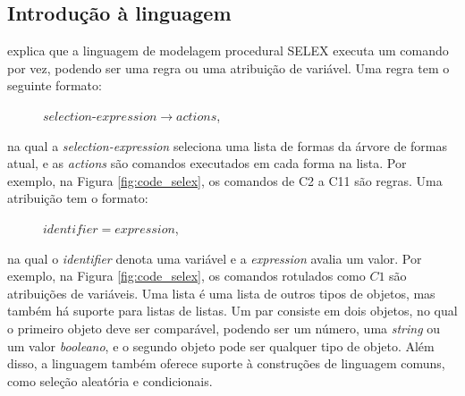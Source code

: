 \newpage

\subsection{Introdução à linguagem}
\label{sec:introducao_selex}

 explica que a linguagem de modelagem procedural \gls{SELEX} executa um comando por vez, podendo ser uma regra ou uma atribuição de variável. Uma regra tem o seguinte formato:

\vspace{0.5cm}

\begin{description}
    \item[] \qquad \qquad $selection\mbox{-}expression \rightarrow actions$,
\end{description}

\vspace{0.5cm}

\noindent na qual a \textit{selection-expression} seleciona uma lista de formas da árvore de formas atual, e as \textit{actions} são comandos executados em cada forma na lista. Por exemplo, na Figura \ref{fig:code_selex}, os comandos de C2 a C11 são regras. Uma atribuição tem o formato:

\vspace{0.5cm}

\begin{description}
    \item[] \qquad \qquad $identifier = expression$,
\end{description}

\vspace{0.5cm}

\noindent na qual o \textit{identifier} denota uma variável e a \textit{expression} avalia um valor. Por exemplo, na Figura \ref{fig:code_selex}, os comandos rotulados como $C1$ são atribuições de variáveis. Uma lista é uma lista de outros tipos de objetos, mas também há suporte para listas de listas. Um par consiste em dois objetos, no qual o primeiro objeto deve ser comparável, podendo ser um número, uma \textit{string} ou um valor \textit{booleano}, e o segundo objeto pode ser qualquer tipo de objeto. Além disso, a linguagem também oferece suporte à construções de linguagem comuns, como seleção aleatória e condicionais.

